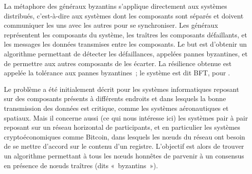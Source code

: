 

La métaphore des généraux byzantins s'applique directement aux systèmes distribués, c'est-à-dire aux systèmes dont les composants sont séparés et doivent communiquer les uns avec les autres pour se synchroniser. Les généraux représentent les composants du système, les traîtres les composants défaillants, et les messages les données transmises entre les composants. Le but est d'obtenir un algorithme permettant de détecter les défaillances, appelées pannes byzantines, et de permettre aux autres composants de les écarter. La résilience obtenue est appelée la tolérance aux pannes byzantines~; le système est dit BFT, pour .

Le problème a été initialement décrit pour les systèmes informatiques reposant sur des composants présents à différents endroits et dans lesquels la bonne transmission des données est critique, comme les systèmes aéronautiques et spatiaux. Mais il concerne aussi (ce qui nous intéresse ici) les systèmes pair à pair reposant sur un réseau horizontal de participants, et en particulier les systèmes cryptoéconomiques comme Bitcoin, dans lesquels les nœuds du réseau ont besoin de se mettre d'accord sur le contenu d'un registre. L'objectif est alors de trouver un algorithme permettant à tous les nœuds honnêtes de parvenir à un consensus en présence de nœuds traîtres (dits «~byzantins~»).

